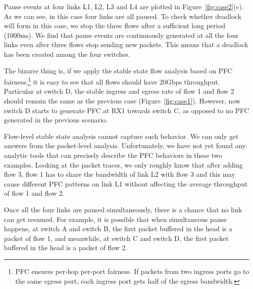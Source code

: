 Pause events at four links L1, L2, L3 and L4 are plotted in Figure~\ref{fig:case2}(c). As we can see, in
this case four links are all paused. To check whether deadlock will form in this case, we stop the three
flows after a sufficient long period (1000ms). We find that pause events are continuously
generated at all the four links even after three flows stop sending new packets.
This means that a deadlock has been created among the four switches.

The bizarre thing is, if we apply the stable state flow analysis based on PFC fairness,\footnote{PFC
ensures per-hop per-port fairness. If packets from two ingress ports go to the same egress port, each ingress
port gets half of the egress bandwidth.} it is easy to see that all flows should have 20Gbps throughput.
Particular at switch D, the stable ingress and egress rate of flow 1 and flow 2 should remain the same as
the previous case (Figure~\ref{fig:case1}). However, now switch D starts to generate PFC at RX1 towards
switch C, as opposed to no PFC generated in the previous scenario.


Flow-level stable state analysis cannot capture such behavior. We can only get answers from the
packet-level analysis. Unfortunately, we have not yet found any analytic tools that can precisely
describe the PFC behaviors in these two examples. Looking at the packet traces, we only roughly know that
after adding flow 3, flow 1 has to share the bandwidth of link L2 with flow 3 and this may cause
different PFC patterns on link L1 without affecting the average throughput of flow 1 and flow 2.


Once all the four links are paused simultaneously, there is a chance that no link can get resumed.
For example, it is possible that when simultaneous pause happens, at switch A and switch B, the
first packet buffered in the head is a packet of flow 1, and meanwhile, at switch C and switch
D, the first packet buffered in the head is a packet of flow 2.  

